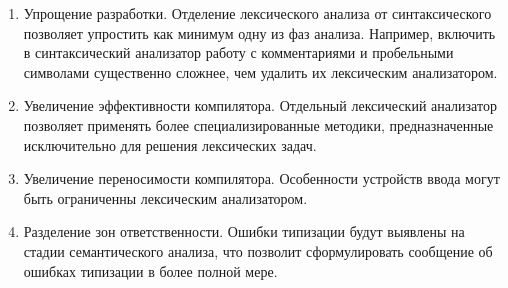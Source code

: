 \begin{enumerate} 
	\item{Упрощение разработки. Отделение лексического анализа от синтаксического позволяет упростить как минимум одну из фаз анализа. Например, включить в синтаксический анализатор работу с комментариями и пробельными символами существенно сложнее, чем удалить их лексическим анализатором.}
	\item{Увеличение эффективности компилятора. Отдельный лексический анализатор позволяет применять более специализированные методики, предназначенные исключительно для решения лексических задач.}
	\item{Увеличение переносимости компилятора. Особенности устройств ввода могут быть ограниченны лексическим анализатором.}
	\item{Разделение зон ответственности. Ошибки типизации будут выявлены на стадии семантического анализа, что позволит сформулировать сообщение об ошибках типизации в более полной мере.}
\end{enumerate}
